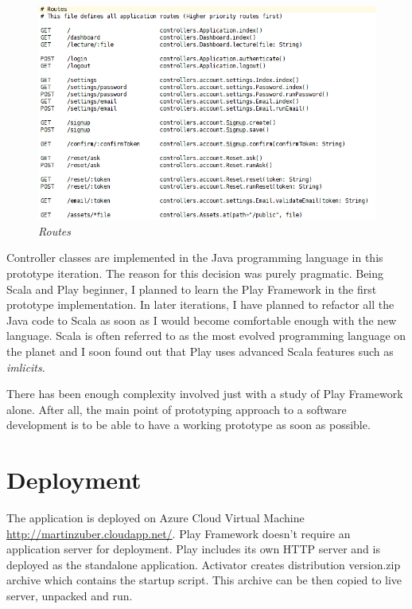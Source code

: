 \documentclass[12pt,twoside,a4paper]{report}
\begin{document}
\begin{figure}[!ht]
	\centering
		\includegraphics[width=1\textwidth, totalheight=9cm]
		{routes}
	\caption{\textit{Routes}}
	\label{f4.5.1.1}
\end{figure}

Controller classes are implemented in the Java programming language in this prototype iteration. The reason for this decision was purely pragmatic. Being Scala and Play beginner, I planned to learn the Play Framework in the first prototype implementation. In later iterations, I have planned to refactor all the Java code to Scala as soon as I would become comfortable enough with the new language. Scala is often referred to as the most evolved programming language on the planet and I soon found out that Play uses advanced Scala features such as \emph{imlicits}.

There has been enough complexity involved just with a study of Play Framework alone. After all, the main point of prototyping approach to a software development is to be able to have a working prototype as soon as possible.

\section{Deployment}\label{4.6}
The application is deployed on Azure Cloud Virtual Machine \url{http://martinzuber.cloudapp.net/}. Play Framework doesn't require an application server for deployment. Play includes its own HTTP server and is deployed as the standalone application. Activator creates distribution version.zip archive which contains the startup script. This archive can be then copied to live server, unpacked and run.
\end{document}
